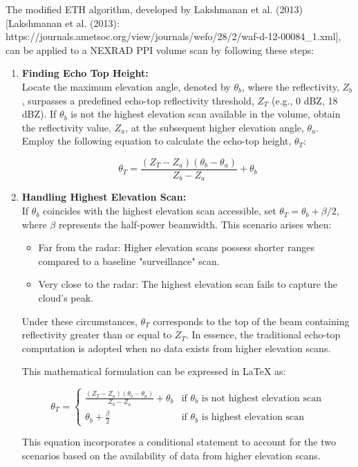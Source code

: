 The modified ETH algorithm, developed by Lakshmanan et al. (2013) [Lakshmanan et
al. (2013):
https://journals.ametsoc.org/view/journals/wefo/28/2/waf-d-12-00084\_1.xml], can
be applied to a NEXRAD PPI volume scan by following these steps:
\begin{enumerate}
    \item \textbf{Finding Echo Top Height:} \\
    Locate the maximum elevation angle, denoted by $\theta_{b}$, where the
reflectivity, $Z_{b}$, surpasses a predefined echo-top reflectivity threshold,
$Z_T$ (e.g., 0 dBZ, 18 dBZ). If $\theta_{b}$ is not the highest elevation scan
available in the volume, obtain the reflectivity value, $Z_{a}$, at the
subsequent higher elevation angle, $\theta_{a}$. Employ the following equation
to calculate the echo-top height, $\theta_T$:

$$\theta_T = \frac{(Z_T - Z_a) (\theta_b - \theta_a)}{Z_b - Z_a} + \theta_b$$

    \item \textbf{Handling Highest Elevation Scan:}\\
    If $\theta_{b}$ coincides with the highest elevation scan accessible, set
    $\theta_{T} = \theta_{b} + \beta/2$, where $\beta$ represents the half-power
    beamwidth. This scenario arises when:
    \begin{itemize}
        \item Far from the radar: Higher elevation scans possess shorter ranges
    compared to a baseline "surveillance" scan.
        \item Very close to the radar: The highest elevation scan fails to
    capture the cloud's peak.
    \end{itemize}
    
Under these circumstances, $\theta_{T}$ corresponds to the top of the beam
containing reflectivity greater than or equal to $Z_T$. In essence, the
traditional echo-top computation is adopted when no data exists from higher
elevation scans.

This mathematical formulation can be expressed in LaTeX as:

$$\theta_T = \begin{cases} \frac{(Z_T - Z_a) (\theta_b - \theta_a)}{Z_b - Z_a} +
\theta_b & \text{if } \theta_b \text{ is not highest elevation scan} \\
\theta_b + \frac{\beta}{2} & \text{if } \theta_b \text{ is highest elevation
scan} \end{cases}$$

This equation incorporates a conditional statement to account for the two
scenarios based on the availability of data from higher elevation scans.

\end{enumerate}